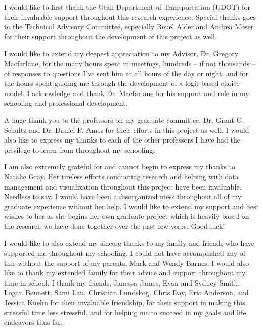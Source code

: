 \afterpage{\cleardoublepage}
%
 I would like to first thank the Utah Department of Transportation (UDOT) for
 their invaluable support throughout this research experience. Special thanks
 goes to the Technical Advisory Committee, especially Reuel Alder and Andrea
 Moser for their support throughout the development of this project as well.

 I would like to extend my deepest appreciation to my Advisor, Dr. Gregory
 Macfarlane, for the many hours spent in meetings, hundreds -- if not thousands
 -- of responses to questions I've sent him at all hours of the day or night, and
 for the hours spent guiding me through the development of a logit-based choice
 model. I acknowledge and thank Dr. Macfarlane for his support and role in my
 schooling and professional development.

A huge thank you to the professors on my graduate committee, Dr. Grant G.
Schultz and Dr. Daniel P. Ames for their efforts in this project as well. I
would also like to express my thanks to each of the other professors I have
had the privilege to learn from throughout my schooling.

 I am also extremely grateful for and cannot begin to express my thanks to
 Natalie Gray. Her tireless efforts conducting research and helping with
 data management and visualization throughout this project have been invaluable. Needless to say,
 I would have been a disorganized mess throughout all of my graduate experience
 without her help. I would like to extend my support and best wishes to her as
 she begins her own graduate project which is heavily based on the research we have done
 together over the past few years. Good luck!

I would like to also extend my sincere thanks to my family and friends who have
supported me throughout my schooling. I could not have accomplished any of this
without the support of my parents, Mark and Wendy Barnes. I would also like to
thank my extended family for their advice and support throughout my time in
school. I thank my friends, Janessa James, Evan and Sydney Smith, Logan Bennett,
Sami Lau, Christian Lundskog, Chris Day, Eric Anderson, and Jessica Kuehn for
their invaluable friendship, for their support in making this stressful time
less stressful, and for helping me to succeed in my goals and life endeavors thus far.
